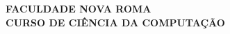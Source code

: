 \begingroup
\singlespacing
\begin{center}
\vspace*{0.5cm}
{\bfseries FACULDADE NOVA ROMA}\\[2pt]
{\bfseries CURSO DE CIÊNCIA DA COMPUTAÇÃO}

\vfill

{\bfseries \tccautor}

\vfill

{\large\bfseries \MakeUppercase{\tcctitulo}}

\vfill
\vfill

{\bfseries \MakeUppercase{\tcclocal}}\\[2pt]
{\bfseries \tccano}
\end{center}
\endgroup
\newpage
